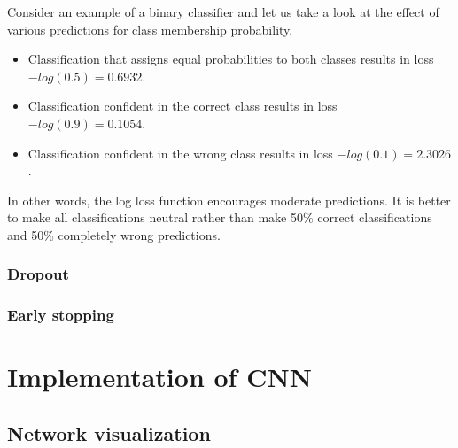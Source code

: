 \documentclass[a4paper, 11pt, table]{article}
\begin{document}
Consider an example of a binary classifier and let us take a look at the effect of various predictions for class membership probability. 
\begin{itemize}
\item Classification that assigns equal probabilities to both classes results in loss $-log(0.5)=0.6932$.  

\item Classification confident in the correct class results in loss $-log(0.9)=0.1054$.

\item Classification confident in the wrong class results in loss $-log(0.1)=2.3026$. 
\end{itemize}

In other words, the log loss function encourages moderate predictions. It is better to make all classifications neutral rather than make 50\% correct classifications and 50\% completely wrong predictions.


\subsubsection{Dropout}

\subsubsection{Early stopping}


\section{Implementation of CNN}

\subsection{Network visualization}
\end{document}
